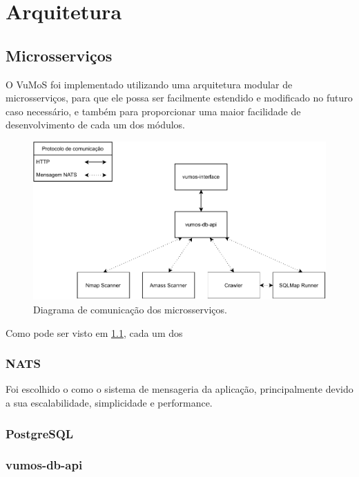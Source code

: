 \chapter{Arquitetura}
\label{cap:arquitetura}

\section{Microsserviços}

    O VuMoS foi implementado utilizando uma arquitetura modular de microsserviços, para que ele possa ser facilmente estendido e modificado no futuro caso necessário, e também para proporcionar uma maior facilidade de desenvolvimento de cada um dos módulos.
    
    \begin{figure}
        \includegraphics[scale=0.8]{conteudo/rdbdb-Microservices.pdf}
        \caption{Diagrama de comunicação dos microsserviços.\label{fig:microservices}}
    \end{figure}
    
    Como pode ser visto em \ref{fig:microservices}, cada um dos 
    
    \subsection{NATS}
    
    Foi escolhido o \cite{NATS} como o sistema de mensageria da aplicação, principalmente devido a sua escalabilidade, simplicidade e performance. 
    
    
    
    \subsection{PostgreSQL}
    \subsection{vumos-db-api}
